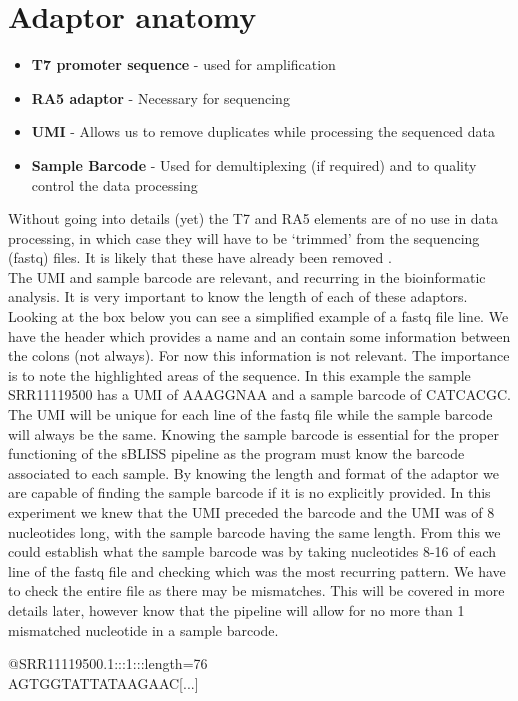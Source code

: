 \section{Adaptor anatomy \label{sec:sBliss_adaptors}}
\begin{itemize}
\item \textbf{T7 promoter sequence} - used for amplification
\item \textbf{RA5 adaptor} - Necessary for sequencing
\item \textbf{UMI} - Allows us to remove duplicates while processing the sequenced data
\item \textbf{Sample Barcode} - Used for demultiplexing (if required) and to quality control the data processing
\end{itemize}
Without going into details (yet) the T7 and RA5 elements are of no use in data processing, in which case they will have to be `trimmed' from the sequencing (fastq) files. It is likely that these have already been removed .\\
The UMI and sample barcode are relevant, and recurring in the bioinformatic analysis. It is very important to know the length of each of these adaptors. Looking at the box below you can see a simplified example of a fastq file line. We have the header which provides a name and an contain some information between the colons (not always). For now this information is not relevant. The importance is to note the highlighted areas of the sequence. In this example the sample SRR11119500 has a UMI of AAAGGNAA and a sample barcode of CATCACGC. The UMI will be unique for each line of the fastq file while the sample barcode will always be the same. Knowing the sample barcode is essential for the proper functioning of the sBLISS pipeline as the program must know the barcode associated to each sample. By knowing the length and format of the adaptor we are capable of finding the sample barcode if it is no explicitly provided. In this experiment we knew that the UMI preceded the barcode and the UMI was of 8 nucleotides long, with the sample barcode having the same length. From this we could establish what the sample barcode was by taking nucleotides 8-16 of each line of the fastq file and checking which was the most recurring pattern. We have to check the entire file as there may be mismatches. This will be covered in more details later, however know that the pipeline will allow for no more than 1 mismatched nucleotide in a sample barcode.

\begin{formal}
@SRR11119500.1:::1:::length=76\\
AGTGGTATTATAAGAAC[...]
\end{formal}

